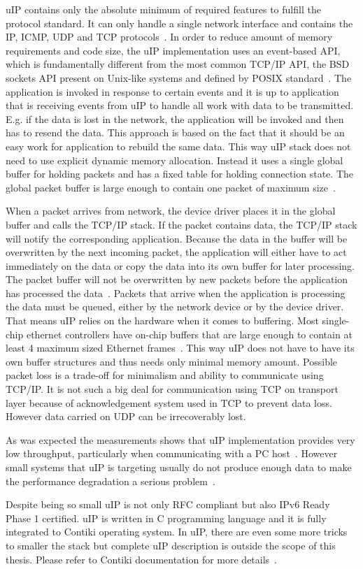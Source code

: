 uIP contains only the absolute minimum of required features to fulfill the protocol standard.
It can only handle a single network interface and contains the IP, ICMP, UDP and TCP protocols~\cite{contiki-docs}.
In order to reduce amount of memory requirements and code size,
the uIP implementation uses an event-based API, which is fundamentally different
from the most common TCP/IP API, the BSD sockets API present on Unix-like systems
and defined by POSIX standard~\cite{thesis-programming,posix}.
The application is invoked in response to certain events and
it is up to application that is receiving events from uIP to handle all
work with data to be transmitted. E.g. if the data is lost in the network,
the application will be invoked and then has to resend the data.
This approach is based on the fact that it should be an easy work for application
to rebuild the same data.
This way uIP stack does not need to use explicit dynamic memory allocation.
Instead it uses a single global buffer for holding packets and has a fixed
table for holding connection state.
The global packet buffer is large enough to contain one packet of maximum size~\cite{contiki-docs}.

When a packet arrives from network, the device driver places it in the
global buffer and calls the TCP/IP stack.
If the packet contains data, the TCP/IP stack will notify the corresponding application.
Because the data in the buffer will be overwritten by the next incoming packet,
the application will either have to act immediately on the data or copy the data into
its own buffer for later processing.
The packet buffer will not be overwritten by new packets before the application has processed the data~\cite{contiki-docs}.
Packets that arrive when the application is processing the data must be queued,
either by the network device or by the device driver.
That means uIP relies on the hardware when it comes to buffering.
Most single-chip ethernet controllers have on-chip buffers
that are large enough to contain at least 4 maximum sized Ethernet frames~\cite{contiki-docs}.
This way uIP does not have to have its own buffer structures and thus
needs only minimal memory amount.
Possible packet loss is a trade-off for minimalism and ability to communicate using TCP/IP.
It is not such a big deal for communication using TCP on transport layer
because of acknowledgement system used in TCP to prevent data loss.
However data carried on UDP can be irrecoverably lost.

As was expected the measurements shows that uIP implementation provides very low
throughput, particularly when communicating with a PC host~\cite{thesis-towards}.
However small systems that uIP is targeting usually do not produce enough data
to make the performance degradation a serious problem~\cite{thesis-towards}.

Despite being so small uIP is not only RFC compliant but also IPv6 Ready Phase 1 certified.
uIP is written in C programming language and it is fully integrated to Contiki operating system.
In uIP, there are even some more tricks to smaller the stack
but complete uIP description is outside the scope of this thesis.
Please refer to Contiki documentation for more details~\cite{contiki-docs}.
